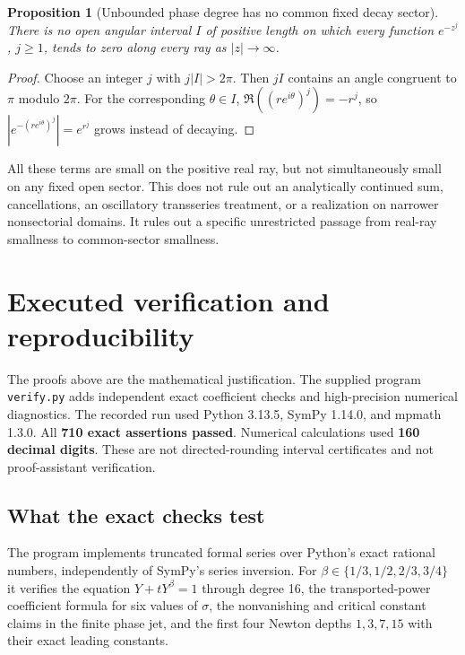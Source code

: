 \documentclass[11pt,a4paper]{article}
\newtheorem{proposition}[theorem]{Proposition}
\theoremstyle{definition}
\theoremstyle{remark}
\numberwithin{equation}{section}
\begin{document}
\begin{proposition}[Unbounded phase degree has no common fixed decay sector]\label{prop:nosector}
There is no open angular interval $I$ of positive length on which every function $e^{-z^j}$, $j\ge1$, tends to zero along every ray as $|z|\to\infty$.
\end{proposition}
\begin{proof}
Choose an integer $j$ with $j|I|>2\pi$. Then $jI$ contains an angle congruent to $\pi$ modulo $2\pi$. For the corresponding $\theta\in I$,
$\Re((r e^{i\theta})^j)=-r^j$, so $|e^{-(r e^{i\theta})^j}|=e^{r^j}$ grows instead of decaying.
\end{proof}

All these terms are small on the positive real ray, but not simultaneously small on any fixed open sector. This does not rule out an analytically continued sum, cancellations, an oscillatory transseries treatment, or a realization on narrower nonsectorial domains. It rules out a specific unrestricted passage from real-ray smallness to common-sector smallness.

\section{Executed verification and reproducibility}\label{sec:verification}

The proofs above are the mathematical justification. The supplied program \texttt{verify.py} adds independent exact coefficient checks and high-precision numerical diagnostics. The recorded run used Python 3.13.5, SymPy 1.14.0, and mpmath 1.3.0. All \textbf{710 exact assertions passed}. Numerical calculations used \textbf{160 decimal digits}. These are not directed-rounding interval certificates and not proof-assistant verification.

\subsection{What the exact checks test}

The program implements truncated formal series over Python's exact rational numbers, independently of SymPy's series inversion. For $\beta\in\{1/3,1/2,2/3,3/4\}$ it verifies the equation $Y+tY^\beta=1$ through degree 16, the transported-power coefficient formula for six values of $\sigma$, the nonvanishing and critical constant claims in the finite phase jet, and the first four Newton depths $1,3,7,15$ with their exact leading constants.
\end{document}
